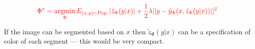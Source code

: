 {\vfill
$${\color{red} \Phi^* = \operatorname*{argmin}_\Phi E_{(x,y) \sim \mathrm{Pop}}\;|\tilde{z}_\Phi(y|x)| + \frac{1}{2}\lambda ||y - \tilde{y}_\Phi(x,\tilde{z}_\Phi(y|x))||^2}$$

\vfill
If the image can be segmented based on $x$ then $\tilde{z}_\Phi(y|x)$ can be a specification of color of each segment --- this would be very compact.



}


